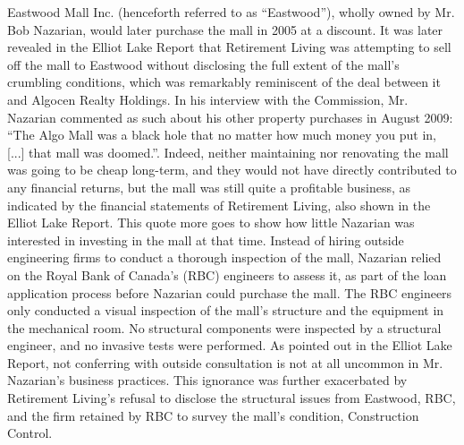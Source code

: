 \documentclass[12pt]{article}
\begin{document}
Eastwood Mall Inc. (henceforth referred to as ``Eastwood''), wholly owned by Mr. Bob Nazarian, would later purchase the mall in 2005 at a discount. It was later revealed in the Elliot Lake Report that Retirement Living was attempting to sell off the mall to Eastwood without disclosing the full extent of the mall's crumbling conditions, which was remarkably reminiscent of the deal between it and Algocen Realty Holdings. In his interview with the Commission, Mr. Nazarian commented as such about his other property purchases in August 2009: ``The Algo Mall was a black hole that no matter how much money you put in, [...] that mall was doomed.''\cite{AlgoLakeReport1}. Indeed, neither maintaining nor renovating the mall was going to be cheap long-term, and they would not have directly contributed to any financial returns, but the mall was still quite a profitable business, as indicated by the financial statements of Retirement Living, also shown in the Elliot Lake Report. This quote more goes to show how little Nazarian was interested in investing in the mall at that time. Instead of hiring outside engineering firms to conduct a thorough inspection of the mall, Nazarian relied on the Royal Bank of Canada's (RBC) engineers to assess it, as part of the loan application process before Nazarian could purchase the mall. The RBC engineers only conducted a visual inspection of the mall's structure and the equipment in the mechanical room. No structural components were inspected by a structural engineer, and no invasive tests were performed. As pointed out in the Elliot Lake Report, not conferring with outside consultation is not at all uncommon in Mr. Nazarian's business practices. This ignorance was further exacerbated by Retirement Living's refusal to disclose the structural issues from Eastwood, RBC, and the firm retained by RBC to survey the mall's condition, Construction Control. 
\end{document}
